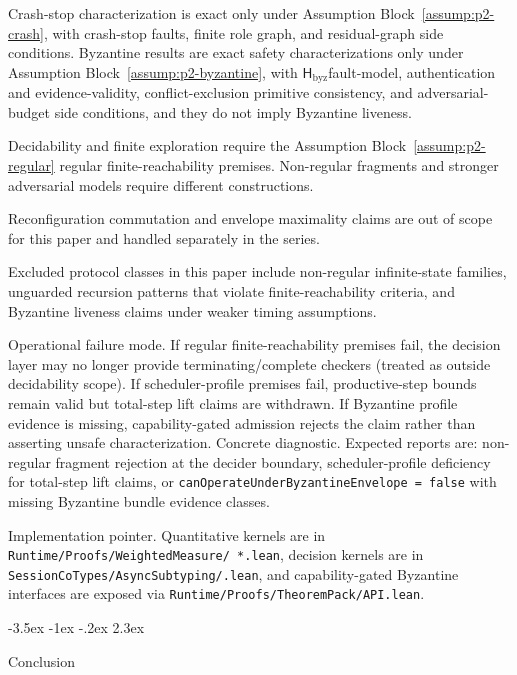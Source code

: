 \documentclass[a4paper,10pt,twocolumn,english]{article}
\makeatletter
\renewcommand{\section}{\@startsection{section}{1}{\z@}%
  {-3.5ex \@plus -1ex \@minus -.2ex}%
  {2.3ex}%
  {\raggedright\normalfont\large\bfseries}}
\numberwithin{equation}{section}
\theoremstyle{paperdef}
\theoremstyle{paperplain}
\theoremstyle{paperdef}
\theoremstyle{paperremark}
\newcommand{\Hbyz}{\ensuremath{\mathsf{H}_{\mathrm{byz}}}}
\makeatother
\begin{document}
Crash-stop characterization is exact only under Assumption Block~\ref{assump:p2-crash}, with crash-stop faults, finite role graph, and residual-graph side conditions. Byzantine results are exact safety characterizations only under Assumption Block~\ref{assump:p2-byzantine}, with \Hbyz fault-model, authentication and evidence-validity, conflict-exclusion primitive consistency, and adversarial-budget side conditions, and they do not imply Byzantine liveness.

Decidability and finite exploration require the Assumption Block~\ref{assump:p2-regular} regular finite-reachability premises. Non-regular fragments and stronger adversarial models require different constructions.

Reconfiguration commutation and envelope maximality claims are out of scope for this paper and handled separately in the series.

Excluded protocol classes in this paper include non-regular infinite-state
families, unguarded recursion patterns that violate finite-reachability
criteria, and Byzantine liveness claims under weaker timing assumptions.

Operational failure mode. If regular finite-reachability premises fail, the
decision layer may no longer provide terminating/complete checkers (treated as
outside decidability scope). If scheduler-profile premises fail, productive-step
bounds remain valid but total-step lift claims are withdrawn. If Byzantine
profile evidence is missing, capability-gated admission rejects the claim rather
than asserting unsafe characterization.
Concrete diagnostic. Expected reports are: non-regular fragment rejection at
the decider boundary, scheduler-profile deficiency for total-step lift claims,
or \texttt{canOperateUnderByzantineEnvelope = false} with missing Byzantine
bundle evidence classes.

Implementation pointer. Quantitative kernels are in
\texttt{Runtime/\allowbreak Proofs/\allowbreak WeightedMeasure/\allowbreak
	*.lean}, decision kernels are in
\texttt{SessionCoTypes/\allowbreak AsyncSubtyping/\allowbreak *.lean}, and
capability-gated Byzantine interfaces are exposed via
\texttt{Runtime/\allowbreak Proofs/\allowbreak TheoremPack/\allowbreak API.lean}.

\section{Conclusion}
\label{sec:conclusion}
\end{document}
